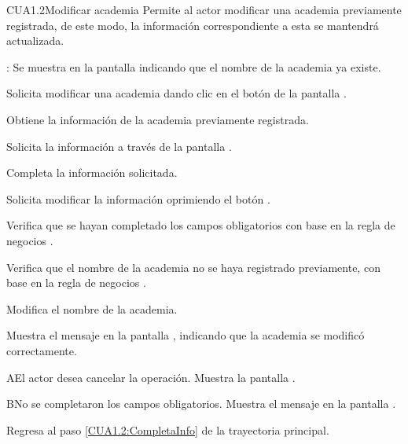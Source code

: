 \begin{UseCase}{CUA1.2}{Modificar academia}{	
	Permite al actor modificar una academia previamente registrada, de este modo, la información correspondiente a esta se mantendrá actualizada.
}
{\begin{UClist}
			\UCli {}: Se muestra en la pantalla  indicando que el nombre de la academia ya existe.
			
		\end{UClist}
	}
\end{UseCase}

\begin{UCtrayectoria}
	\UCpaso [\UCactor] Solicita modificar una academia dando clic en el botón 
	de la pantalla . 
		
	\UCpaso [\UCsist] Obtiene la información de la academia previamente registrada.

	\UCpaso[\UCsist] Solicita la información a través de la pantalla .
	
	\UCpaso [\UCactor] Completa la información solicitada. \label{CUA1.2:CompletaInfo}
	
	\UCpaso [\UCactor] Solicita modificar la información oprimiendo el botón . 
	
	\UCpaso [\UCsist] Verifica que se hayan completado los campos obligatorios con base en la regla de negocios . 
	
	\UCpaso [\UCsist] Verifica que el nombre de la academia no se haya registrado previamente, con base en la regla de negocios . 
		
	\UCpaso [\UCsist] Modifica el nombre de la academia.
	
	\UCpaso [\UCsist] Muestra el mensaje  en la pantalla , indicando que la academia se modificó correctamente.	
	
\end{UCtrayectoria}



\begin{UCtrayectoriaA}{A}{El actor desea cancelar la operación.}
	\UCpaso [\UCsist] Muestra la pantalla . 
\end{UCtrayectoriaA}

\begin{UCtrayectoriaA}{B}{No se completaron los campos obligatorios.}
	\UCpaso [\UCsist] Muestra el mensaje  en la pantalla .
	
	\UCpaso Regresa al paso \ref{CUA1.2:CompletaInfo} de la trayectoria principal.
\end{UCtrayectoriaA}

